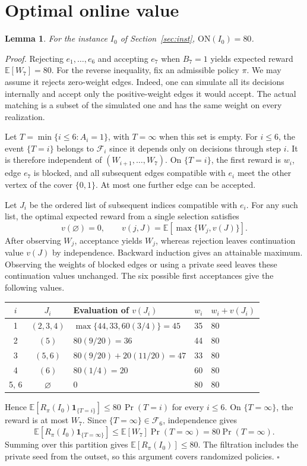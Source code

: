 \documentclass[11pt,a4paper]{article}
\newcommand{\E}{\mathbb{E}}
\newtheorem{lema}{Lemma}
\newenvironment{prueba}[1][Proof]{\par\smallskip\noindent\textit{#1.}\enspace}{\unskip\nobreak\hfill\(\square\)\par\smallskip}
\newcommand{\ON}{\mathrm{ON}}
\newcommand{\F}{\mathcal F}
\begin{document}
\clearpage
\section{Optimal online value}
\begin{lema}\label{lem:on}
For the instance \(I_0\) of Section~\ref{sec:inst}, \(\ON(I_0)=80\).
\end{lema}
\begin{prueba}
Rejecting \(e_1,\ldots,e_6\) and accepting \(e_7\) when \(B_7=1\) yields expected reward \(\E[W_7]=80\). For the reverse inequality, fix an admissible policy \(\pi\). We may assume it rejects zero-weight edges. Indeed, one can simulate all its decisions internally and accept only the positive-weight edges it would accept. The actual matching is a subset of the simulated one and has the same weight on every realization.

Let \(T=\min\{i\leq6:A_i=1\}\), with \(T=\infty\) when this set is empty. For \(i\leq6\), the event \(\{T=i\}\) belongs to \(\F_i\) since it depends only on decisions through step \(i\). It is therefore independent of \((W_{i+1},\ldots,W_7)\). On \(\{T=i\}\), the first reward is \(w_i\), edge \(e_7\) is blocked, and all subsequent edges compatible with \(e_i\) meet the other vertex of the cover \(\{0,1\}\). At most one further edge can be accepted.

Let \(J_i\) be the ordered list of subsequent indices compatible with \(e_i\). For any such list, the optimal expected reward from a single selection satisfies
\[
 v(\varnothing)=0,\qquad
 v(j,J)=\E[\max\{W_j,v(J)\}].
\]
After observing \(W_j\), acceptance yields \(W_j\), whereas rejection leaves continuation value \(v(J)\) by independence. Backward induction gives an attainable maximum. Observing the weights of blocked edges or using a private seed leaves these continuation values unchanged. The six possible first acceptances give the following values.
\begin{center}
\begin{tabular}{@{}cclcl@{}}\toprule
\(i\)& \(J_i\)&Evaluation of \(v(J_i)\)& \(w_i\)& \(w_i+v(J_i)\)\\\midrule
1 & \((2,3,4)\)& \(\max\{44,33,60(3/4)\}=45\)&35&80\\
2 & \((5)\)& \(80(9/20)=36\)&44&80\\
3 & \((5,6)\)& \(80(9/20)+20(11/20)=47\)&33&80\\
4 & \((6)\)& \(80(1/4)=20\)&60&80\\
5, 6 & \(\varnothing\)& \(0\)&80&80\\\bottomrule
\end{tabular}
\end{center}
Hence \(\E[R_\pi(I_0)\mathbf 1_{\{T=i\}}]\leq80\,\Pr(T=i)\) for every \(i\leq6\). On \(\{T=\infty\}\), the reward is at most \(W_7\). Since \(\{T=\infty\}\in\F_6\), independence gives
\[
 \E[R_\pi(I_0)\mathbf 1_{\{T=\infty\}}]\leq
 \E[W_7]\Pr(T=\infty)=80\Pr(T=\infty).
\]
Summing over this partition gives \(\E[R_\pi(I_0)]\leq80\). The filtration includes the private seed from the outset, so this argument covers randomized policies.
\end{prueba}
\end{document}
